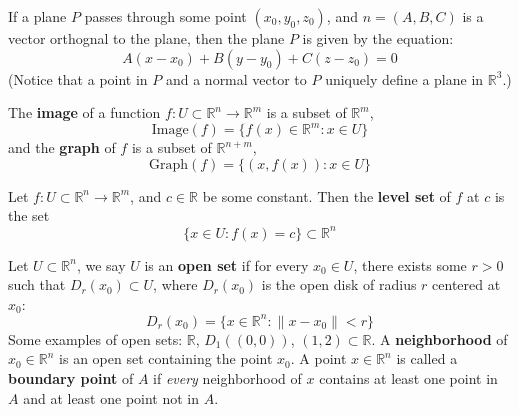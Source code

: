 \documentclass[openany]{book}
\newcommand{\R}{\mathbb{R}}
\begin{document}
\begin{defn}[Plane in $\R^3$]\label{plane}
   If a plane ${P}$ passes through some point $(x_0,y_0,z_0)$, and $n=(A,B,C)$ is a vector orthognal to the plane, then the plane ${P}$ is given by the equation:
    \begin{equation*}
        A(x-x_0)+B(y-y_0)+C(z-z_0)=0
    \end{equation*}
    (Notice that a point in ${P}$ and a normal vector to ${P}$ uniquely define a plane in $\R^3$.)
\end{defn}


\begin{defn}
    The \textbf{image} of a function $f: U\subset\R^n\to\R^m$ is a subset of $\R^m$,
    \begin{equation*}
        \text{Image}(f)=\{f(x)\in\R^m: x\in U\}
    \end{equation*}
    and the \textbf{graph} of $f$ is a subset of $\R^{n+m}$,
    \begin{equation*}
        \text{Graph}(f)=\{(x,f(x)): x\in U\}
    \end{equation*}
\end{defn}


\begin{defn}
    Let $f:U\subset\R^n\to\R^m$, and $c\in\R$ be some constant. Then the \textbf{level set} of $f$ at $c$ is the set 
    \begin{equation*}
        \{x\in U: f(x)=c\}\subset\R^n
    \end{equation*}
\end{defn}

\begin{defn}
    Let $U\subset\R^n$, we say $U$ is an \textbf{open set} if for every $x_0\in U$, there exists some $r>0$ such that $D_r(x_0)\subset U$, where $D_r(x_0)$ is the open disk of radius $r$ centered at $x_0$:
    \begin{equation*}
        D_r(x_0)=\{x\in\R^n: \|x-x_0\|<r\}
    \end{equation*}
    Some examples of open sets: $\R$, $D_{1}((0,0))$, $(1,2)\subset\R$.
    A \textbf{neighborhood} of $x_0\in\R^n$ is an open set containing the point $x_0$. A point $x\in\R^n$ is called a \textbf{boundary point} of $A$ if \textit{every} neighborhood of $x$ contains at least one point in $A$ and at least one point not in $A$.
\end{defn}
\end{document}
